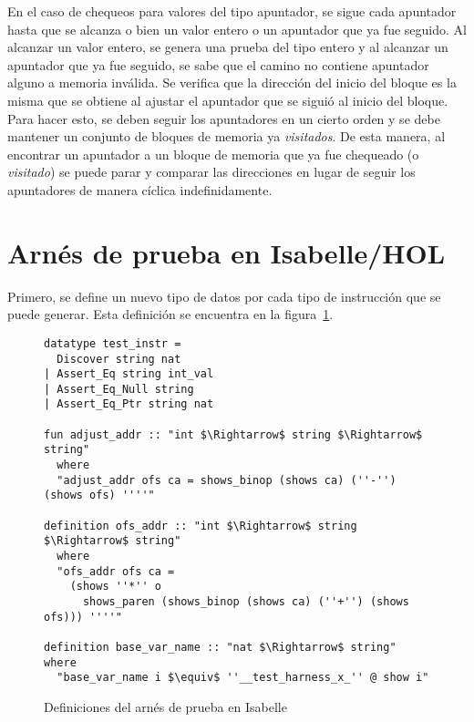 En el caso de chequeos para valores del tipo apuntador, se sigue cada apuntador hasta que se alcanza o bien un valor entero o un apuntador que ya fue seguido.
Al alcanzar un valor entero, se genera una prueba del tipo entero y al alcanzar un apuntador que ya fue seguido, se sabe que el camino no contiene apuntador alguno a memoria inválida.
Se verifica que la dirección del inicio del bloque es la misma que se obtiene al ajustar el apuntador que se siguió al inicio del bloque.
Para hacer esto, se deben seguir los apuntadores en un cierto orden y se debe mantener un conjunto de bloques de memoria ya \textit{visitados}.
De esta manera, al encontrar un apuntador a un bloque de memoria que ya fue chequeado (o \textit{visitado}) se puede parar y comparar las direcciones en lugar de seguir los apuntadores de manera cíclica indefinidamente.

\begin{comment}
Se presenta aquí la idea intuitiva detrás de la generación de pruebas y en las siguientes secciones se describen los detalles de implementación para los arneses de pruebas, ambos en Isabelle y C.
\end{comment}

\section{Arnés de prueba en Isabelle/HOL}

Primero, se define un nuevo tipo de datos por cada tipo de instrucción que se puede generar.
Esta definición se encuentra en la figura~\ref{fig:test_harness_datatype}.


\begin{figure}
\begin{lstlisting}[mathescape=true]
datatype test_instr =
  Discover string nat
| Assert_Eq string int_val
| Assert_Eq_Null string
| Assert_Eq_Ptr string nat

fun adjust_addr :: "int $\Rightarrow$ string $\Rightarrow$ string"
  where
  "adjust_addr ofs ca = shows_binop (shows ca) (''-'') (shows ofs) ''''"

definition ofs_addr :: "int $\Rightarrow$ string $\Rightarrow$ string"
  where
  "ofs_addr ofs ca =
    (shows ''*'' o
      shows_paren (shows_binop (shows ca) (''+'') (shows ofs))) ''''"

definition base_var_name :: "nat $\Rightarrow$ string" where
  "base_var_name i $\equiv$ ''__test_harness_x_'' @ show i"
\end{lstlisting}

\caption{Definiciones del arnés de prueba en Isabelle}
\label{fig:test_harness_datatype}
\end{figure}

